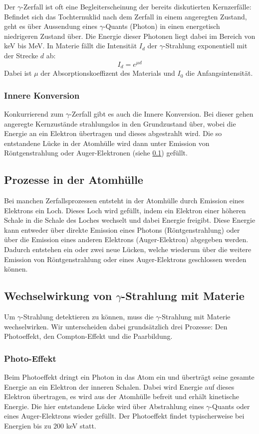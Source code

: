 \documentclass[12pt]{article}
\begin{document}
Der $\gamma$-Zerfall ist oft eine Begleiterscheinung der bereits diskutierten Kernzerfälle: Befindet sich das Tochternuklid nach dem Zerfall in einem angeregten Zustand, geht es über Aussendung eines $\gamma$-Quants (Photon)  in einen energetisch niedrigeren Zustand über. Die Energie dieser Photonen liegt dabei im Bereich von keV bis MeV. In Materie fällt die Intensität $I_d$ der $\gamma$-Strahlung exponentiell mit der Strecke $d$ ab:
\[I_d=e^{\mu d}\]
Dabei ist $\mu$ der Absorptionskoeffizent des Materials und $I_0$ die Anfangsintensität.

\subsubsection{Innere Konversion}
Konkurrierend zum $\gamma$-Zerfall gibt es auch die Innere Konversion. Bei dieser gehen angeregte Kernzustände strahlungslos in den Grundzustand über, wobei die Energie an ein Elektron übertragen und dieses abgestrahlt wird. Die so entstandene Lücke in der Atomhülle wird dann unter Emission von Röntgenstrahlung oder Auger-Elektronen (siehe \ref{auger}) gefüllt.

\subsection{Prozesse in der Atomhülle}\label{auger}
Bei manchen Zerfallsprozessen entsteht in der Atomhülle durch Emission eines Elektrons ein Loch. Dieses Loch wird gefüllt, indem ein Elektron einer höheren Schale in die Schale des Loches wechselt und dabei Energie freigibt. Diese Energie kann entweder über direkte Emission eines Photons (Röntgenstrahlung) oder über die Emission eines anderen Elektrons (Auger-Elektron) abgegeben werden. Dadurch entstehen ein oder zwei neue Lücken, welche wiederum über die weitere Emission von Röntgenstrahlung oder eines Auger-Elektrons geschlossen werden können.

\subsection{Wechselwirkung von $\gamma$-Strahlung mit Materie}
Um $\gamma$-Strahlung detektieren zu können, muss die $\gamma$-Strahlung mit Materie wechselwirken. Wir unterscheiden dabei grundsätzlich drei Prozesse: Den Photoeffekt, den Compton-Effekt und die Paarbildung.
 \subsubsection{Photo-Effekt}
 Beim Photoeffekt dringt ein Photon in das Atom ein und überträgt seine gesamte Energie an ein Elektron der inneren Schalen. Dabei wird Energie auf dieses Elektron übertragen, es wird aus der Atomhülle befreit und erhält kinetische Energie. Die hier entstandene Lücke wird über Abstrahlung eines $\gamma$-Quants oder eines Auger-Elektrons wieder gefüllt.
 Der Photoeffekt findet typischerweise bei Energien bis zu $200$ keV statt.
\end{document}
